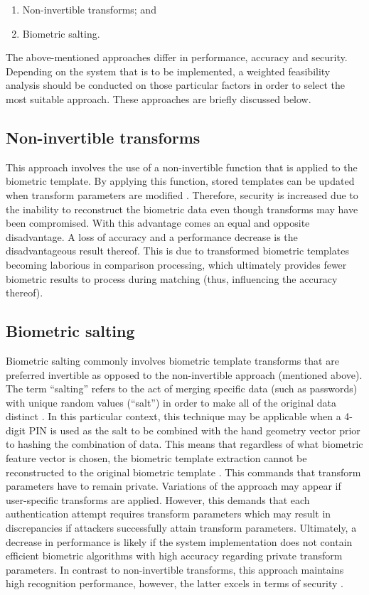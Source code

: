 \begin{enumerate}[label=\roman*.]
	\item Non-invertible transforms; and
	\item Biometric salting.
\end{enumerate}

The above-mentioned approaches differ in performance, accuracy and security. Depending on the system that is to be implemented, a weighted feasibility analysis should be conducted on those particular factors in order to select the most suitable approach. These approaches are briefly discussed below.

	\subsection{Non-invertible transforms}
	This approach involves the use of a non-invertible function that is applied to the biometric template. By applying this function, stored templates can be updated when transform parameters are modified \citep{Piciucco2016,Rathgeb2011}. Therefore, security is increased due to the inability to reconstruct the biometric data even though transforms may have been compromised. With this advantage comes an equal and opposite disadvantage. A loss of accuracy and a performance decrease is the disadvantageous result thereof. This is due to transformed biometric templates becoming laborious in comparison processing, which ultimately provides fewer biometric results to process during matching (thus, influencing the accuracy thereof).
	
	\subsection{Biometric salting}
	Biometric salting commonly involves biometric template transforms that are preferred invertible as opposed to the non-invertible approach (mentioned above). The term “salting” refers to the act of merging specific data (such as passwords) with unique random values (“salt”) in order to make all of the original data distinct \citep{SyedAhmad2012}. In this particular context, this technique may be applicable when a 4-digit PIN is used as the salt to be combined with the hand geometry vector prior to hashing the combination of data. This means that regardless of what biometric feature vector is chosen, the biometric template extraction cannot be reconstructed to the original biometric template \citep{Paul2014,Rathgeb2011}. This commands that transform parameters have to remain private. Variations of the approach may appear if user-specific transforms are applied. However, this demands that each authentication attempt requires transform parameters which may result in discrepancies if attackers successfully attain transform parameters. Ultimately, a decrease in performance is likely if the system implementation does not contain efficient biometric algorithms with high accuracy regarding private transform parameters. In contrast to non-invertible transforms, this approach maintains high recognition performance, however, the latter excels in terms of security \citep{Radha2011, Rathgeb2011}.



